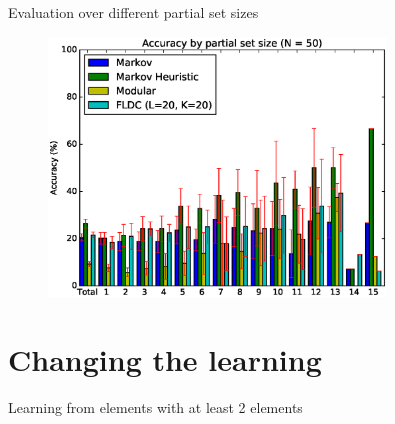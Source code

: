 \documentclass{beamer}
\begin{document}
\begin{frame}{Evaluation over different partial set sizes}
  \begin{figure}
    \centering
    \includegraphics[width=0.8\textwidth]{set_size_score_50}
  \end{figure}
\end{frame}

\section{Changing the learning}

\begin{frame}{Learning from elements with at least 2 elements}
  
\end{frame}

%  
%  
\end{document}
